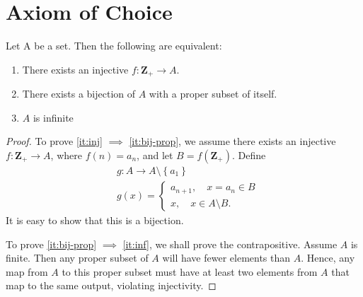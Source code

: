 \section{Axiom of Choice}
\begin{theorem}
Let A be a set. Then the following are equivalent:
\begin{enumerate}
  \item\label{it:inj} There exists an injective $f: \mathbf{Z}_{+} \to A$.
  \item\label{it:bij-prop} There exists a bijection of $A$ with a proper subset of itself.
  \item\label{it:inf} $A$ is infinite
\end{enumerate}
\label{thm:inj-mapping}
\end{theorem}
\begin{proof}
To prove \cref{it:inj} $\implies$ \cref{it:bij-prop}, we assume there exists an injective $f: \mathbf{Z}_{+} \to A$, where $f(n) =
a_{n}$, and let $B = f(\mathbf{Z}_{+})$. Define
\begin{equation*}
\begin{split}
& g: A \to A \setminus \left\{ a_{1} \right\} \\
& g(x) = \begin{cases}
a_{n+1}, \quad x = a_{n} \in B \\
x, \quad x \in A \setminus B.
\end{cases}
\end{split}
\end{equation*} It is easy to show that this is a bijection.

To prove \cref{it:bij-prop} $\implies$ \cref{it:inf}, we shall prove the
contrapositive. Assume $A$ is finite. Then any proper subset of $A$ will have
fewer elements than $A$. Hence, any map from $A$ to this proper subset must
have at least two elements from $A$ that map to the same output, violating
injectivity.


\end{proof}
